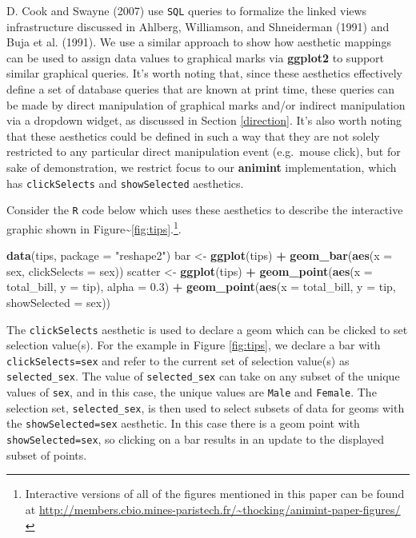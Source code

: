 \documentclass[12pt,]{article}
\newenvironment{Shaded}{\begin{snugshade}}{\end{snugshade}}
\newcommand{\DataTypeTok}[1]{\textcolor[rgb]{0.13,0.29,0.53}{#1}}
\newcommand{\FloatTok}[1]{\textcolor[rgb]{0.00,0.00,0.81}{#1}}
\newcommand{\KeywordTok}[1]{\textcolor[rgb]{0.13,0.29,0.53}{\textbf{#1}}}
\newcommand{\NormalTok}[1]{#1}
\newcommand{\OperatorTok}[1]{\textcolor[rgb]{0.81,0.36,0.00}{\textbf{#1}}}
\newcommand{\StringTok}[1]{\textcolor[rgb]{0.31,0.60,0.02}{#1}}
\let\rmarkdownfootnote\footnote%
\def\footnote{\protect\rmarkdownfootnote}
\theoremstyle{definition}
\theoremstyle{definition}
\theoremstyle{definition}
\theoremstyle{remark}
\begin{document}
D. Cook and Swayne (2007) use \texttt{SQL} queries to formalize the
linked views infrastructure discussed in Ahlberg, Williamson, and
Shneiderman (1991) and Buja et al. (1991). We use a similar approach to
show how aesthetic mappings can be used to assign data values to
graphical marks via \textbf{ggplot2} to support similar graphical
queries. It's worth noting that, since these aesthetics effectively
define a set of database queries that are known at print time, these
queries can be made by direct manipulation of graphical marks and/or
indirect manipulation via a dropdown widget, as discussed in Section
\ref{direction}. It's also worth noting that these aesthetics could be
defined in such a way that they are not solely restricted to any
particular direct manipulation event (e.g.~mouse click), but for sake of
demonstration, we restrict focus to our \textbf{animint} implementation,
which has \texttt{clickSelects} and \texttt{showSelected} aesthetics.

Consider the \texttt{R} code below which uses these aesthetics to
describe the interactive graphic shown in
Figure\textasciitilde{}\ref{fig:tips}.\footnote{Interactive versions
of all of the figures mentioned in this paper can be found at
\url{http://members.cbio.mines-paristech.fr/~thocking/animint-paper-figures/}}.

\begin{Shaded}
\begin{Highlighting}[]
\KeywordTok{data}\NormalTok{(tips, }\DataTypeTok{package =} \StringTok{"reshape2"}\NormalTok{)}
\NormalTok{bar <-}\StringTok{ }\KeywordTok{ggplot}\NormalTok{(tips) }\OperatorTok{+}\StringTok{ }
\StringTok{  }\KeywordTok{geom_bar}\NormalTok{(}\KeywordTok{aes}\NormalTok{(}\DataTypeTok{x =}\NormalTok{ sex, }\DataTypeTok{clickSelects =}\NormalTok{ sex))}
\NormalTok{scatter <-}\StringTok{ }\KeywordTok{ggplot}\NormalTok{(tips) }\OperatorTok{+}
\StringTok{  }\KeywordTok{geom_point}\NormalTok{(}\KeywordTok{aes}\NormalTok{(}\DataTypeTok{x =}\NormalTok{ total_bill, }\DataTypeTok{y =}\NormalTok{ tip), }\DataTypeTok{alpha =} \FloatTok{0.3}\NormalTok{) }\OperatorTok{+}
\StringTok{  }\KeywordTok{geom_point}\NormalTok{(}\KeywordTok{aes}\NormalTok{(}\DataTypeTok{x =}\NormalTok{ total_bill, }\DataTypeTok{y =}\NormalTok{ tip, }\DataTypeTok{showSelected =}\NormalTok{ sex))}
\end{Highlighting}
\end{Shaded}

The \texttt{clickSelects} aesthetic is used to declare a geom which can
be clicked to set selection value(s). For the example in Figure
\ref{fig:tips}, we declare a bar with \texttt{clickSelects=sex} and
refer to the current set of selection value(s) as
\texttt{selected\_sex}. The value of \texttt{selected\_sex} can take on
any subset of the unique values of \texttt{sex}, and in this case, the
unique values are \texttt{Male} and \texttt{Female}. The selection set,
\texttt{selected\_sex}, is then used to select subsets of data for geoms
with the \texttt{showSelected=sex} aesthetic. In this case there is a
geom point with \texttt{showSelected=sex}, so clicking on a bar results
in an update to the displayed subset of points.
\end{document}
